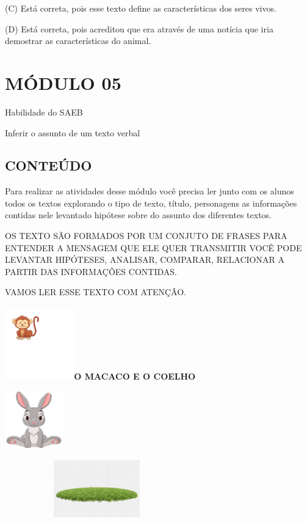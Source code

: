 (C) Está correta, pois esse texto define as características dos seres
vivos.

(D) Está correta, pois acreditou que era através de uma notícia que iria
demostrar as características do animal.

\section{MÓDULO 05}\label{muxf3dulo-05}

\protect\hypertarget{_Hlk129200547}{}{}Habilidade do SAEB
\protect\hypertarget{_Hlk128810826}{}{}

Inferir o assunto de um texto verbal

\subsection{CONTEÚDO}\label{conteuxfado-4}

Para realizar as atividades desse módulo você precisa ler junto com os
alunos todos os textos explorando o tipo de texto, título, personagens
as informações contidas nele levantado hipótese sobre do assunto dos
diferentes textos.

OS TEXTO SÃO FORMADOS POR UM CONJUTO DE FRASES PARA ENTENDER A MENSAGEM
QUE ELE QUER TRANSMITIR VOCÊ PODE LEVANTAR HIPÓTESES, ANALISAR,
COMPARAR, RELACIONAR A PARTIR DAS INFORMAÇÕES CONTIDAS.

VAMOS LER ESSE TEXTO COM ATENÇÃO.

\includegraphics[width=1.17910in,height=1.23722in]{media/image116.png}\textbf{O
MACACO E O COELHO}

\includegraphics[width=0.98508in,height=0.98508in]{media/image117.png}

\includegraphics[width=3.14122in,height=0.97761in]{media/image118.jpeg}

